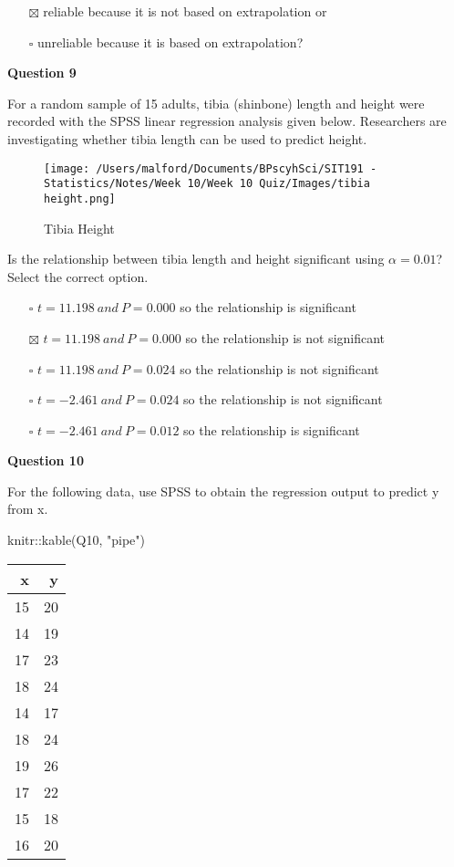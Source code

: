 \documentclass[
]{article}
\newenvironment{Shaded}{\begin{snugshade}}{\end{snugshade}}
\newcommand{\FunctionTok}[1]{\textcolor[rgb]{0.00,0.00,0.00}{#1}}
\newcommand{\NormalTok}[1]{#1}
\newcommand{\SpecialCharTok}[1]{\textcolor[rgb]{0.00,0.00,0.00}{#1}}
\newcommand{\StringTok}[1]{\textcolor[rgb]{0.31,0.60,0.02}{#1}}
\providecommand{\tightlist}{%
  \setlength{\itemsep}{0pt}\setlength{\parskip}{0pt}}
\begin{document}
\begin{itemize}
\tightlist
\item[$\boxtimes$]
  reliable because it is not based on extrapolation or
\item[$\square$]
  unreliable because it is based on extrapolation?
\end{itemize}

\textbf{Question 9}

For a random sample of 15 adults, tibia (shinbone) length and height
were recorded with the SPSS linear regression analysis given below.
Researchers are investigating whether tibia length can be used to
predict height.

\begin{figure}
\centering
\texttt{[image: /Users/malford/Documents/BPscyhSci/SIT191 - Statistics/Notes/Week 10/Week 10 Quiz/Images/tibia height.png]}
\caption{Tibia Height}
\end{figure}

Is the relationship between tibia length and height significant using
\(\alpha = 0.01\)? Select the correct option.

\begin{itemize}
\tightlist
\item[$\square$]
  \(t = 11.198\ and\ P = 0.000\) so the relationship is significant
\item[$\boxtimes$]
  \(t = 11.198\ and\ P = 0.000\) so the relationship is not significant
\item[$\square$]
  \(t = 11.198\ and\ P = 0.024\) so the relationship is not significant
\item[$\square$]
  \(t = -2.461\ and\ P = 0.024\) so the relationship is not significant
\item[$\square$]
  \(t = -2.461\ and\ P = 0.012\) so the relationship is significant
\end{itemize}

\textbf{Question 10}

For the following data, use SPSS to obtain the regression output to
predict y from x.

\begin{Shaded}
\begin{Highlighting}[]
\NormalTok{knitr}\SpecialCharTok{::}\FunctionTok{kable}\NormalTok{(Q10, }\StringTok{"pipe"}\NormalTok{)}
\end{Highlighting}
\end{Shaded}

\begin{longtable}[]{@{}rr@{}}
\toprule
x & y \\
\midrule
\endhead
15 & 20 \\
14 & 19 \\
17 & 23 \\
18 & 24 \\
14 & 17 \\
18 & 24 \\
19 & 26 \\
17 & 22 \\
15 & 18 \\
16 & 20 \\
\bottomrule
\end{longtable}
\end{document}
